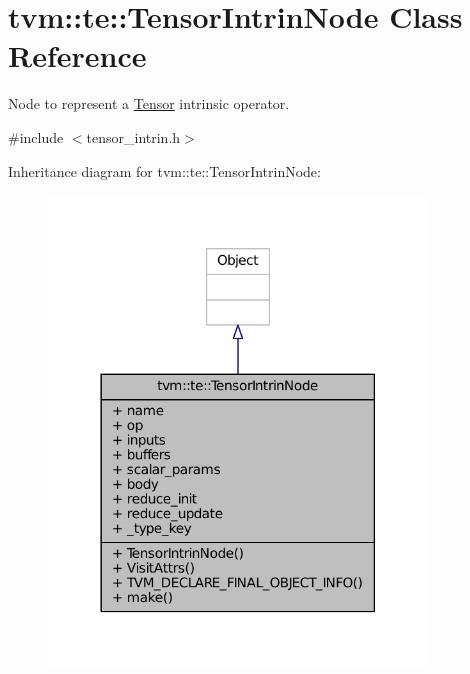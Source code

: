 \hypertarget{classtvm_1_1te_1_1TensorIntrinNode}{}\section{tvm\+:\+:te\+:\+:Tensor\+Intrin\+Node Class Reference}
\label{classtvm_1_1te_1_1TensorIntrinNode}


Node to represent a \hyperlink{classtvm_1_1te_1_1Tensor}{Tensor} intrinsic operator.  




{\ttfamily \#include $<$tensor\+\_\+intrin.\+h$>$}



Inheritance diagram for tvm\+:\+:te\+:\+:Tensor\+Intrin\+Node\+:
\nopagebreak
\begin{figure}[H]
\begin{center}
\leavevmode
\includegraphics[width=285pt]{classtvm_1_1te_1_1TensorIntrinNode__inherit__graph}
\end{center}
\end{figure}


